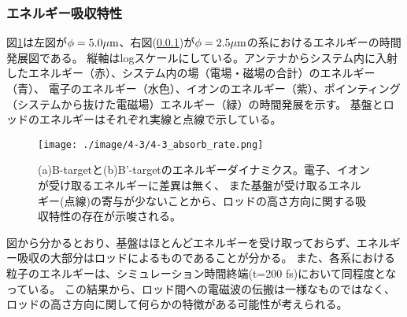 \documentclass[a4paper,11pt,titlepage]{jsarticle}
\begin{document}
    \subsubsection{エネルギー吸収特性}
    図\ref{fig:4-3_absorb_rate}は左図が$\phi = 5.0 \mu \rm{m}$、右図(\ref{})が$\phi = 2.5 \mu \rm{m}$の系におけるエネルギーの時間発展図である。
    縦軸はlogスケールにしている。アンテナからシステム内に入射したエネルギー（赤）、システム内の場（電場・磁場の合計）のエネルギー（青）、
    電子のエネルギー（水色）、イオンのエネルギー（紫）、ポインティング（システムから抜けた電磁場）エネルギー（緑）の時間発展を示す。
    基盤とロッドのエネルギーはそれぞれ実線と点線で示している。
    \begin{figure}[H]
      \begin{center}
        \texttt{[image: ./image/4-3/4-3\_absorb\_rate.png]}
        \caption{
          \label{fig:4-3_absorb_rate}
          (a)B-targetと(b)B'-targetのエネルギーダイナミクス。電子、イオンが受け取るエネルギーに差異は無く、
          また基盤が受け取るエネルギー(点線)の寄与が少ないことから、ロッドの高さ方向に関する吸収特性の存在が示唆される。
        }
      \end{center}
    \end{figure}
    図から分かるとおり、基盤はほとんどエネルギーを受け取っておらず、エネルギー吸収の大部分はロッドによるものであることが分かる。
    また、各系における粒子のエネルギーは、シミュレーション時間終端(t=200 fs)において同程度となっている。
    この結果から、ロッド間への電磁波の伝搬は一様なものではなく、
    ロッドの高さ方向に関して何らかの特徴がある可能性が考えられる。
\end{document}
